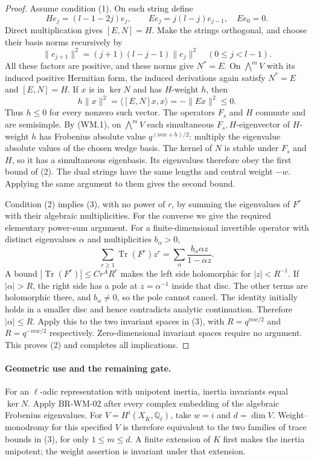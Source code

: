 \documentclass[11pt,a4paper]{article}
\theoremstyle{definition}\newtheorem{definition}[theorem]{Definition}
\theoremstyle{remark}\newtheorem{remark}[theorem]{Remark}
\begin{document}
\begin{proof}
Assume condition (1). On each string define
\[
 H e_j=(l-1-2j)e_j,\qquad
 E e_j=j(l-j)e_{j-1},\quad E e_0=0.
\]
Direct multiplication gives $[E,N]=H$.
Make the strings orthogonal, and choose their basis norms
recursively by
\[
 \|e_{j+1}\|^2=(j+1)(l-j-1)\|e_j\|^2
       \quad(0\leq j<l-1).
\]
All these factors are positive, and these norms give
$N^*=E$. On $\bigwedge^mV$ with its induced positive
Hermitian form, the induced derivations again satisfy
$N^*=E$ and $[E,N]=H$.
If $x$ is in $\ker N$ and has $H$-weight $h$, then
\[
 h\|x\|^2=\langle [E,N]x,x\rangle=-\|Ex\|^2\leq0.
\]
Thus $h\leq0$ for every nonzero such vector.
The operators $F_s$ and $H$ commute and are semisimple.
By (WM.1), on $\bigwedge^mV$ each simultaneous
$F_s,H$-eigenvector of $H$-weight $h$ has Frobenius
absolute value $q^{(mw+h)/2}$: multiply the eigenvalue
absolute values of the chosen wedge basis.
The kernel of $N$ is stable under $F_s$ and $H$, so it
has a simultaneous eigenbasis. Its eigenvalues therefore
obey the first bound of (2). The dual strings have the
same lengths and central weight $-w$. Applying the
same argument to them gives the second bound.

Condition (2) implies (3), with no power of $r$,
by summing the eigenvalues of $F^r$ with their
algebraic multiplicities. For the converse we give
the required elementary power-sum argument. For a
finite-dimensional invertible operator with distinct
eigenvalues $\alpha$ and multiplicities $b_\alpha>0$,
\[
 \sum_{r\geq1}\operatorname{Tr}(F^r)z^r
       =\sum_\alpha\frac{b_\alpha\alpha z}{1-\alpha z}.
\]
A bound $|\operatorname{Tr}(F^r)|\leq Cr^AR^r$
makes the left side holomorphic for $|z|<R^{-1}$.
If $|\alpha|>R$, the right side has a pole at
$z=\alpha^{-1}$ inside that disc. The other terms
are holomorphic there, and $b_\alpha\ne0$, so the
pole cannot cancel. The identity initially holds
in a smaller disc and hence contradicts analytic
continuation. Therefore $|\alpha|\leq R$.
Apply this to the two invariant spaces in (3),
with $R=q^{mw/2}$ and $R=q^{-mw/2}$ respectively.
Zero-dimensional invariant spaces require no argument.
This proves (2) and completes all implications.
\end{proof}

\paragraph{Geometric use and the remaining gate.}
For an $\ell$-adic representation with unipotent inertia,
inertia invariants equal $\ker N$. Apply BR-WM-02
after every complex embedding of the algebraic Frobenius
eigenvalues. For $V=H^i(X_{\overline K},\mathbb Q_\ell)$,
take $w=i$ and $d=\dim V$. Weight--monodromy for this
specified $V$ is therefore equivalent to the two
families of trace bounds in (3), for only
$1\leq m\leq d$. A finite extension of $K$ first
makes the inertia unipotent; the weight assertion
is invariant under that extension.
\end{document}
